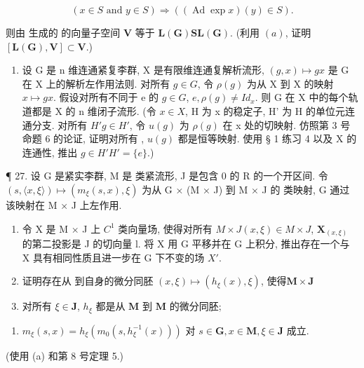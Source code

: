 \[
(x \in S \text {   and   } y \in S) \Rightarrow ((\operatorname{Ad} \exp x) (y) \in S).
\]

则由  生成的  的向量子空间 \(\mathbf{V}\) 等于 \(\mathbf{L}(\mathbf{G})\)\(\mathbf{S}\)\(\mathbf{L}(\mathbf{G})\). (利用 \((a)\), 证明 \([\mathbf{L}(\mathbf{G}), \mathbf{V}] \subset \mathbf{V}\).)

\begin{enumerate}
\def\labelenumi{\arabic{enumi}.}
\setcounter{enumi}{25}
\tightlist
\item
  设 G 是 n 维连通紧复李群, X 是有限维连通复解析流形, \((g, x) \mapsto gx\) 是 G 在 X 上的解析左作用法则. 对所有 \(g \in G\), 令 \(\rho(g)\) 为从 X 到 X 的映射 \(x \mapsto gx\). 假设对所有不同于 e 的 \(g \in G\), \(e, \rho(g) \neq Id_x\). 则 G 在 X 中的每个轨道都是 X 的 n 维闭子流形. (令 \(x \in X\), H 为 x 的稳定子, H' 为 H 的单位元连通分支. 对所有 \(H'\)\(g \in H'\), 令 \(u(g)\) 为 \(\rho(g)\) 在 x 处的切映射. 仿照第 3 号命题 6 的论证, 证明对所有 , \(u(g)\) 都是恒等映射. 使用 § 1 练习 4 以及 X 的连通性, 推出 \(g \in H'\)\(H' = \{e\}\).)
\end{enumerate}

¶ 27. 设 G 是紧实李群, M 是  类紧流形, J 是包含 0 的 R 的一个开区间. 令 \((s, \langle x, \xi \rangle) \mapsto (m_{\xi}(s, x), \xi)\) 为从 G × (M × J) 到 M × J 的  类映射, G 通过该映射在 M × J 上左作用.

\begin{enumerate}
\def\labelenumi{(\alph{enumi})}
\item
  令 X 是 M × J 上 \(C^{1}\) 类向量场, 使得对所有 \(M \times J\)\((x, \xi) \in M \times J\), \(\mathbf{X}_{(x, \xi)}\) 的第二投影是 J 的切向量 l. 将 X 用 G 平移并在 G 上积分, 推出存在一个与 X 具有相同性质且进一步在 G 下不变的场 \(X'\).
\item
  证明存在从  到自身的微分同胚 \((x, \xi) \mapsto (h_{\xi}(x), \xi)\), 使得\(\mathbf{M} \times \mathbf{J}\)
\item
  对所有 \(\xi \in \mathbf{J}\), \(h_{\xi}\) 都是从 \(\mathbf{M}\) 到 \(\mathbf{M}\) 的微分同胚;
\end{enumerate}

\begin{enumerate}
\def\labelenumi{(\roman{enumi})}
\setcounter{enumi}{1}
\tightlist
\item
  \(m_{\xi}(s,x) = h_{\xi}(m_0(s,h_{\xi}^{-1}(x)))\) 对 \(s\in \mathbf{G}, x\in \mathbf{M},\xi \in \mathbf{J}\) 成立.
\end{enumerate}

(使用 (a) 和第 8 号定理 5.)

